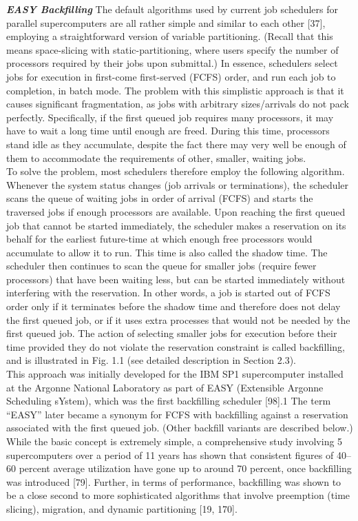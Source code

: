 \textbf{\textit{EASY Backfilling }}The default algorithms used by current job schedulers for parallel supercomputers are all rather simple and similar to each other [37], employing a straightforward version of variable partitioning. (Recall that this means space-slicing with static-partitioning, where users specify the number of processors required by their jobs upon submittal.) In essence, schedulers select jobs for execution in first-come first-served (FCFS) order, and run each job to completion, in batch mode. The problem with this simplistic approach is that it causes significant fragmentation, as jobs with arbitrary sizes/arrivals do not pack perfectly. Specifically, if the first queued job requires many processors, it may have to wait a long time until enough are freed. During this time, processors stand idle as they accumulate, despite the fact there may very well be enough of them to accommodate the requirements of other, smaller, waiting jobs.\\

To solve the problem, most schedulers therefore employ the following algorithm. Whenever the system status changes (job arrivals or terminations), the scheduler scans the queue of waiting jobs in order of arrival (FCFS) and starts the traversed jobs if enough processors are available. Upon reaching the first queued job that cannot be started immediately, the scheduler makes a reservation on its behalf for the earliest future-time at which enough free processors would accumulate to allow it to run. This time is also called the shadow time. The scheduler then continues to scan the queue for smaller jobs (require fewer processors) that have been waiting less, but can be started immediately without interfering with the reservation. In other words, a job is started out of FCFS order only if it terminates before the shadow time and therefore does not delay the first queued job, or if it uses extra processes that would not be needed by the first queued job. The action of selecting smaller jobs for execution before their time provided they do not violate the reservation constraint is called backfilling, and is illustrated in Fig. 1.1 (see detailed description in Section 2.3).\\

This approach was initially developed for the IBM SP1 supercomputer installed at the Argonne National Laboratory as part of EASY (Extensible Argonne Scheduling sYstem), which was the first backfilling scheduler [98].1 The term “EASY” later became a synonym for FCFS with backfilling against a reservation associated with the first queued job. (Other backfill variants are described below.) While the basic concept is extremely simple, a comprehensive study involving 5 supercomputers over a period of 11 years has shown that consistent figures of 40–60 percent average
utilization have gone up to around 70 percent, once backfilling was introduced [79]. Further, in terms of performance, backfilling was shown to be a close second to more sophisticated algorithms that involve preemption (time slicing), migration, and dynamic partitioning [19, 170].\\

